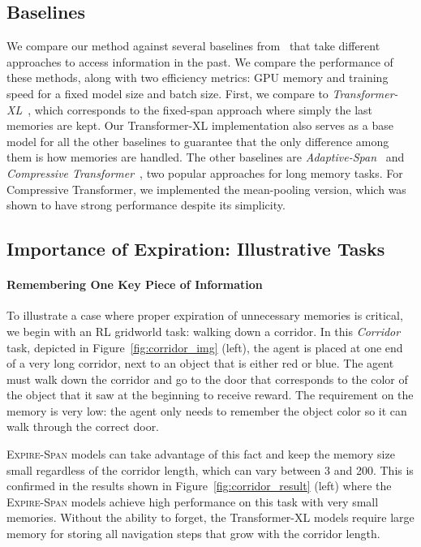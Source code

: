 \subsection{Baselines}
We compare our method against several baselines from~ that take different approaches to access information in the past. 
We compare the performance of these methods, along with two efficiency metrics: GPU memory and training speed for a fixed model size and batch size.
First, we compare to \textit{Transformer-XL}~\citep{dai2019transformer}, which corresponds to the fixed-span approach where simply the last  memories are kept. 
Our Transformer-XL implementation also serves as a base model for all the other baselines to guarantee that the only difference among them is how memories are handled. 
The other baselines are \textit{Adaptive-Span}~\citep{sukhbaatar2019adaptive} and \textit{Compressive Transformer}~\citep{rae2020compressive}, two popular approaches for long memory tasks. For Compressive Transformer, we implemented the  mean-pooling version, which was shown to have strong performance despite its simplicity. 

\subsection{Importance of Expiration: Illustrative Tasks}

\paragraph{Remembering One Key Piece of Information}

To illustrate a case where proper expiration of unnecessary memories is critical, we begin with an RL gridworld task: walking down a corridor. In this \textit{Corridor} task, depicted in Figure~\ref{fig:corridor_img} (left), the agent is placed at one end of a very long corridor, next to an object that is either red or blue. The agent must walk down the corridor and go to the door that corresponds to the color of the object that it saw at the beginning to receive  reward. The requirement on the memory is very low: the agent only needs to remember the object color so it can walk through the correct door. 

\textsc{Expire-Span} models can take advantage of this fact and keep the memory size small regardless of the corridor length, which can vary between 3 and 200. 
This is confirmed in the results shown in Figure~\ref{fig:corridor_result} (left) where the \textsc{Expire-Span} models achieve high performance on this task with very small memories. 
Without the ability to forget, the Transformer-XL models require large memory for storing all navigation steps that grow with the corridor length.


